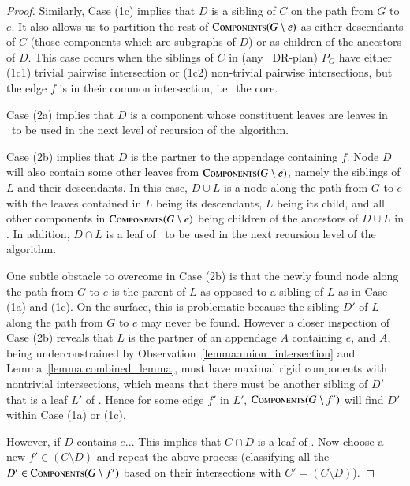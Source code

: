 \begin{proof}
    Similarly, Case (1c) implies that $D$ is a sibling of $C$ on the path from $G$ to $e$. It also allows us to partition the rest of $\textsc{Components}(G\setminus e)$ as either descendants of $C$ (those components which are subgraphs of $D$) or as children of the ancestors of $D$. This case occurs when the siblings of $C$ in (any \pseudosequential\ DR-plan) $P_G$ have either (1c1) trivial pairwise intersection or (1c2) non-trivial pairwise intersections, but the edge $f$ is in their common intersection, i.e.\ the core.

    Case (2a) implies that $D$ is a component whose constituent leaves are leaves in \branchLfPL\ to be used in the next level of recursion of the algorithm.


    Case (2b) implies that $D$ is the partner to the appendage containing $f$. Node $D$ will also contain some other leaves from $\textsc{Components}(G\setminus e)$, namely the siblings of $L$ and their descendants. In this case, $D\cup L$ is a node along the path from $G$ to $e$ with the leaves contained in $L$ being its descendants, $L$ being its child, and all other components in $\textsc{Components}(G\setminus e)$ being children of the ancestors of $D\cup L$ in \branchGePG. In addition, $D\cap L$ is a leaf of \branchLfPL\ to be used in the next recursion level of the algorithm.

    One subtle obstacle to overcome in Case (2b) is that the newly found node along the path from $G$ to $e$ is the parent of $L$ as opposed to a sibling of $L$ as in Case (1a) and (1c). On the surface, this is problematic because the sibling $D'$ of $L$ along the path from $G$ to $e$ may never be found. However a closer inspection of Case (2b) reveals that $L$ is the partner of an appendage $A$ containing $e$, and $A$, being underconstrained by Observation~\ref{lemma:union_intersection} and Lemma~\ref{lemma:combined_lemma}, must have maximal rigid components with nontrivial intersections, which means that there must be another sibling of $D'$ that is a leaf $L'$ of \branchGePG. Hence for some edge $f'$ in $L'$, $\textsc{Components}(G\setminus f')$ will find $D'$ within Case (1a) or (1c).

    However, if $D$ contains $e$...
    This implies that $C\cap D$ is a leaf of \branchGePG. Now choose a new $f'\in (C\setminus D)$ and repeat the above process (classifying all the $D'\in \textsc{Components}(G\setminus f')$ based on their intersections with $C'=(C\setminus D)$).




\end{proof}
